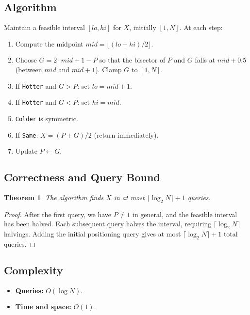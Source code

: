 \documentclass[11pt,a4paper]{article}
\newtheorem{theorem}{Theorem}
\begin{document}
\subsection{Algorithm}
Maintain a feasible interval $[\mathit{lo}, \mathit{hi}]$ for $X$, initially $[1, N]$. At each step:
\begin{enumerate}
    \item Compute the midpoint $\mathit{mid} = \lfloor (\mathit{lo} + \mathit{hi}) / 2 \rfloor$.
    \item Choose $G = 2 \cdot \mathit{mid} + 1 - P$ so that the bisector of $P$ and $G$ falls at $\mathit{mid} + 0.5$ (between $\mathit{mid}$ and $\mathit{mid}+1$). Clamp $G$ to $[1, N]$.
    \item If \texttt{Hotter} and $G > P$: set $\mathit{lo} = \mathit{mid} + 1$.
    \item If \texttt{Hotter} and $G < P$: set $\mathit{hi} = \mathit{mid}$.
    \item \texttt{Colder} is symmetric.
    \item If \texttt{Same}: $X = (P + G) / 2$ (return immediately).
    \item Update $P \leftarrow G$.
\end{enumerate}

\subsection{Correctness and Query Bound}

\begin{theorem}
The algorithm finds $X$ in at most $\lceil \log_2 N \rceil + 1$ queries.
\end{theorem}
\begin{proof}
After the first query, we have $P \neq 1$ in general, and the feasible interval has been halved. Each subsequent query halves the interval, requiring $\lceil \log_2 N \rceil$ halvings. Adding the initial positioning query gives at most $\lceil \log_2 N \rceil + 1$ total queries.
\end{proof}

\subsection{Complexity}
\begin{itemize}
    \item \textbf{Queries:} $O(\log N)$.
    \item \textbf{Time and space:} $O(1)$.
\end{itemize}
\end{document}
